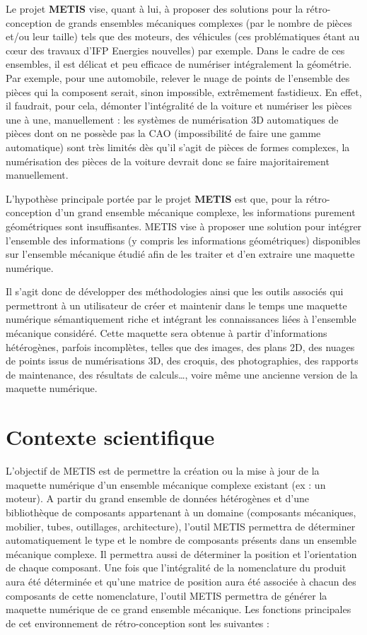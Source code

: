 Le projet \textbf{METIS} vise, quant à lui, à proposer des solutions pour la rétro-conception de grands ensembles mécaniques complexes (par le nombre de pièces et/ou leur taille) tels que des moteurs, des véhicules (ces problématiques étant au cœur des travaux d’IFP Energies nouvelles) par exemple. Dans le cadre de ces ensembles, il est délicat et peu efficace de numériser intégralement la géométrie. Par exemple, pour une automobile, relever le nuage de points de l’ensemble des pièces qui la composent serait, sinon impossible, extrêmement fastidieux. En effet, il faudrait, pour cela, démonter l’intégralité de la voiture et numériser les pièces une à une, manuellement : les systèmes de numérisation 3D automatiques de pièces dont on ne possède pas la CAO (impossibilité de faire une gamme automatique) sont très limités dès qu’il s’agit de pièces de formes complexes, la numérisation des pièces de la voiture devrait donc se faire majoritairement manuellement.
 
L’hypothèse principale portée par le projet \textbf{METIS} est que, pour la rétro-conception d’un grand ensemble mécanique complexe, les informations purement géométriques sont insuffisantes. METIS vise à proposer une solution pour intégrer l’ensemble des informations (y compris les informations géométriques) disponibles sur l’ensemble mécanique étudié afin de les traiter et d’en extraire une maquette numérique.
 
Il s’agit donc de développer des méthodologies ainsi que les outils associés qui permettront à un utilisateur de créer et maintenir dans le temps une maquette numérique sémantiquement riche et intégrant les connaissances liées à l’ensemble mécanique considéré. Cette maquette sera obtenue à partir d’informations hétérogènes, parfois incomplètes, telles que des images, des plans 2D, des nuages de points issus de numérisations 3D, des croquis, des photographies, des rapports de maintenance, des résultats de calculs…, voire même une ancienne version de la maquette numérique.

\section{Contexte scientifique}

L’objectif de METIS est de permettre la création ou la mise à jour de la maquette numérique d’un ensemble mécanique complexe existant (ex : un moteur). A partir du grand ensemble de données hétérogènes et d’une bibliothèque de composants appartenant à un domaine (composants mécaniques, mobilier, tubes, outillages, architecture), l’outil METIS permettra de déterminer automatiquement le type et le nombre de composants présents dans un ensemble mécanique complexe. Il permettra aussi de déterminer la position et l’orientation de chaque composant. Une fois que l’intégralité de la nomenclature du produit aura été déterminée et qu’une matrice de position aura été associée à chacun des composants de cette nomenclature, l’outil METIS permettra de générer la maquette numérique de ce grand ensemble mécanique. Les fonctions principales de cet environnement de rétro-conception sont les suivantes :


